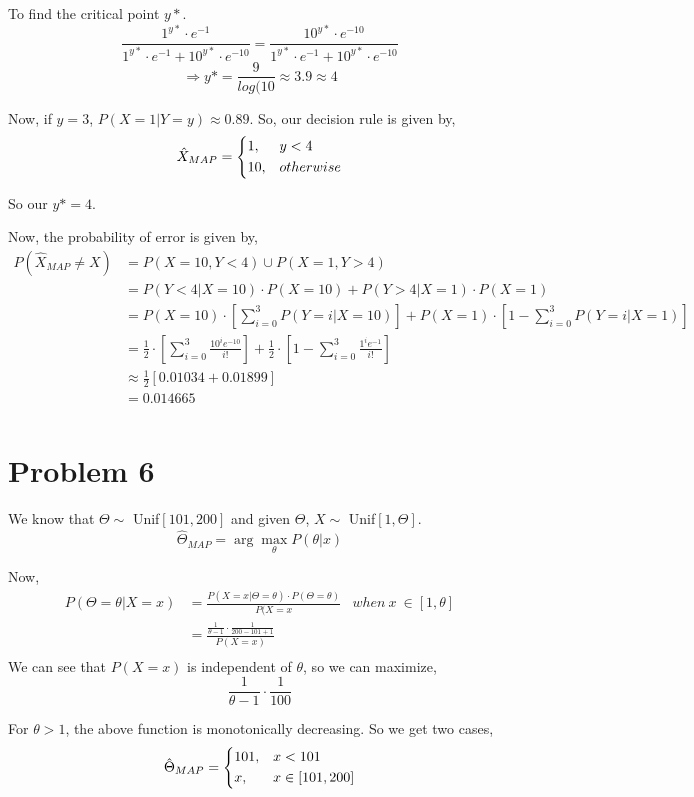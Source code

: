 \documentclass{article}
\begin{document}
	To find the critical point $y*$.
	$$ \frac{1^{y*} \cdot e^{-1}}{1^{y*} \cdot e^{-1}+10^{y*} \cdot e^{-10}} = \frac{10^{y*} \cdot e^{-10}}{1^{y*} \cdot e^{-1}+10^{y*} \cdot e^{-10}} $$
	$$ \Rightarrow y* = \frac{9}{log(10} \approx 3.9 \approx 4 $$

	Now, if $y=3$, $P(X=1|Y=y) \approx 0.89$. So, our decision rule is given by,
	$$ \hat{X}_{MAP} = \begin{dcases}
		1, & y<4 \\
		10, & otherwise \\
		\end{dcases}
	$$

	So our $y*= 4 $.

	Now, the probability of error is given by,
	$$ \begin{aligned}
P(\hat{X}_{MAP} \neq X) &= P(X=10,Y<4) \cup P(X=1,Y>4) \\
		&= P(Y<4|X=10)\cdot P(X=10) +P(Y>4|X=1)\cdot P(X=1) \\
		&= P(X=10) \cdot \left[ \sum_{i=0}^{3} P(Y=i|X=10) \right] + P(X=1) \cdot \left[ 1- \sum_{i=0}^{3} P(Y=i|X=1) \right] \\
		&= \frac{1}{2} \cdot \left[ \sum_{i=0}^{3} \frac{10^{i} e^{-10}}{i!} \right] + \frac{1}{2} \cdot \left[ 1- \sum_{i=0}^{3} \frac{1^i e^{-1}}{i!} \right] \\
		&\approx \frac{1}{2} \left[ 0.01034+0.01899 \right] \\
		&= 0.014665 \\
	\end{aligned}
	$$

\section*{Problem 6}
	We know that $\Theta \sim$ Unif$[101,200]$ and given $\Theta$, $X \sim$ Unif$[1,\Theta]$. 
	$$ \hat\Theta_{MAP} = \arg \max_{\theta} P(\theta |x) $$

	Now, $$ \begin{aligned}
	P(\Theta = \theta | X=x ) &= \frac{P(X=x|\Theta = \theta) \cdot P(\Theta = \theta)}{P(X=x} & when\ x\ \in [1,\theta] \\
		&= \frac{\frac{1}{\theta - 1}\cdot \frac{1}{200-101 + 1}}{P(X=x)} & \\ 
		\end{aligned}
	$$
	We can see that $P(X=x)$ is independent of $\theta$, so we can maximize,
	$$ \frac{1}{\theta - 1} \cdot \frac{1}{100} $$
	
	For $\theta > 1$, the above function is monotonically decreasing. So we get two cases,
	$$ \hat{\Theta}_{MAP} = \begin{dcases}	
		101, &  x < 101 \\
		x, & x \in  [101, 200] \\
		\end{dcases}
	$$
\end{document}
